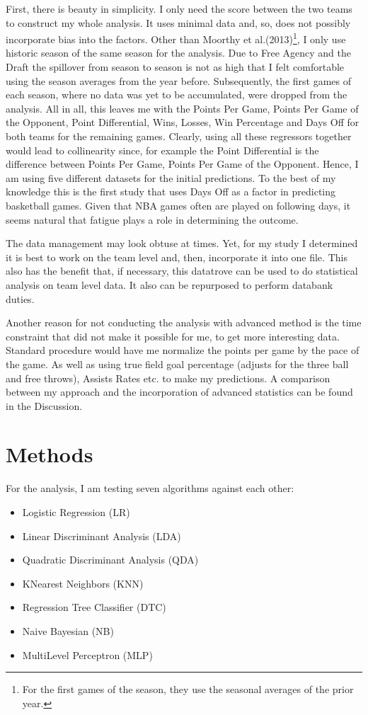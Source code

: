 \documentclass[11pt,a4paper,leqno]{article}
\begin{document}
First, there is beauty in simplicity. I only need the score between the two teams to construct my whole analysis. It uses minimal data and, so, does not possibly  incorporate bias into the factors.
Other than Moorthy et al.(2013)\footnote{For the first games of the season, they use the seasonal averages of the prior year.},  I only use historic season of the same season for the analysis. Due to Free Agency and the Draft the spillover from season to season is not as high that I felt comfortable using the season averages from the year before. Subsequently, the first games of each season, where no data was yet to be accumulated, were dropped from the analysis. All in all, this leaves me with the  Points Per Game, Points Per Game of the Opponent, Point Differential, Wins, Losses, Win Percentage and Days Off for both teams for the remaining games. Clearly, using all these regressors together would lead to collinearity since, for example the Point Differential is the difference between Points Per Game, Points Per Game of the Opponent. Hence, I am using five different datasets for the initial predictions. To the best of my knowledge this is the first study that uses Days Off as a factor in predicting basketball games. Given that NBA games often are played on following days, it seems natural that fatigue plays a role in determining the outcome.

The data management may look obtuse at times. Yet, for my study I determined it is best to work on the team level and, then, incorporate it into one file. This also has the benefit that, if necessary, this datatrove can be used to do statistical analysis on team level data. It also can be repurposed to perform databank duties.

Another reason for not conducting the analysis with advanced method is the time constraint that did not make it possible for me, to get more interesting data. Standard procedure would have me normalize the points per game by the pace of the game. As well as using true field goal percentage (adjusts for the three ball and free throws), Assists Rates etc. to make my predictions. A comparison between my approach and the incorporation of  advanced statistics can be found in the Discussion.

\section{Methods}

For the analysis, I am testing seven algorithms against each other: \\
\begin{itemize}
\setlength\itemsep{0.1em}
\item Logistic Regression (LR)
\item Linear Discriminant Analysis (LDA)
\item Quadratic Discriminant Analysis (QDA)
\item K\-Nearest Neighbors (KNN)
\item Regression Tree Classifier (DTC)
\item Naive Bayesian (NB)
\item Multi\-Level Perceptron (MLP)
\end{itemize}
\end{document}
